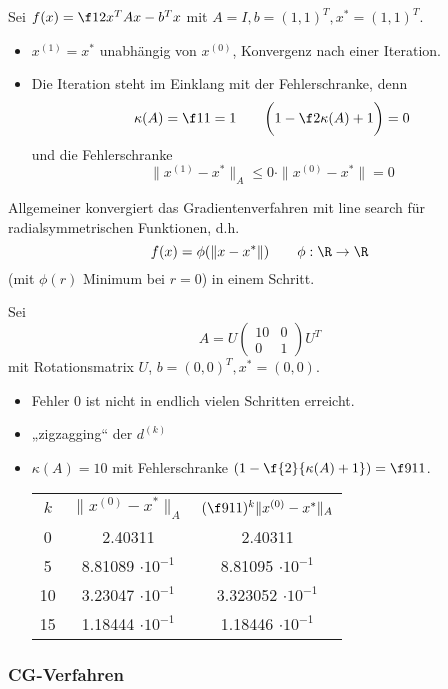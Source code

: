 \documentclass[11pt]{scrartcl}
\begin{document}
\begin{ex*}
	Sei $f(x) = \f 12 x^T A x - b^Tx$ mit $A = I, b = (1,1)^T, x^* = (1,1)^T$.
	\begin{itemize}
		\item
			$x^{(1)} = x^*$ unabhängig von $x^{(0)}$, Konvergenz nach einer Iteration.
		\item
			Die Iteration steht im Einklang mit der Fehlerschranke, denn
			\[
				\kappa(A) = \f 11 = 1
				\qquad
				\bigg( 1 - \f 2{\kappa(A) + 1}\bigg) = 0
			\]
			und die Fehlerschranke
			\[
				\|x^{(1)} - x^*\|_A \le 0 \cdot \|x^{(0)} - x^*\| = 0
			\]
	\end{itemize}
	Allgemeiner konvergiert das Gradientenverfahren mit line search für radialsymmetrischen Funktionen, d.h.
	\[
		f(x) = \phi(\|x-x^*\|)
		\qquad \phi : \R \to \R
	\]
	(mit $\phi(r)$ Minimum bei $r=0$) in einem Schritt.
\end{ex*}

\begin{ex*}
	Sei
	\[
		A = U \begin{pmatrix}
			10 & 0 \\
			0 & 1
		\end{pmatrix} U^T
	\]
	mit Rotationsmatrix $U$, $b = (0,0)^T, x^* = (0,0)$.
	\begin{itemize}
		\item
			Fehler $0$ ist nicht in endlich vielen Schritten erreicht.
		\item
			„zigzagging“ der $d^{(k)}$
		\item
			$\kappa(A) = 10$ mit Fehlerschranke $(1- \f {2}{\kappa(A)+1}) = \f 9{11}$.
			\begin{table}[h]
				\centering
				\begin{tabular}{c|c|c}
					$k$ & $\|x^{(0)} - x^*\|_A$ & $(\f 9{11})^k \|x^{(0)} - x^*\|_A$ \\
					0 & 2.40311 & 2.40311 \\
					5 & 8.81089 $\cdot 10^{-1}$ & 8.81095 $\cdot 10^{-1}$ \\
					10 & 3.23047 $\cdot 10^{-1}$ & 3.323052 $\cdot 10^{-1}$ \\
					15 & 1.18444 $\cdot 10^{-1} $& 1.18446 $\cdot 10^{-1}$
				\end{tabular}
			\end{table}
	\end{itemize}
\end{ex*}


\subsubsection{CG-Verfahren}
\end{document}
